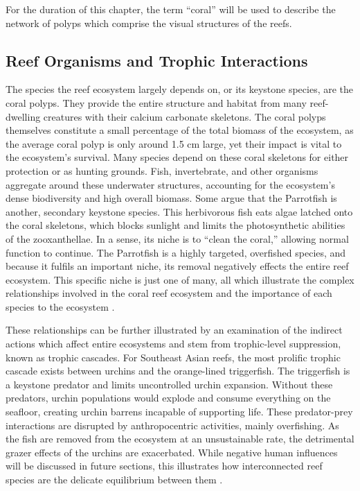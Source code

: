 \documentclass{book}\usepackage{knitr}
\begin{document}
\begin{knitrout}
\begin{kframe}
For the duration of this chapter, the term ``coral'' will be used to describe the network of polyps which comprise the visual structures of the reefs. 

\subsection{Reef Organisms and Trophic Interactions}

The species the reef ecosystem largely depends on, or its keystone species, are the coral polyps. They provide the entire structure and habitat from many reef-dwelling creatures with their calcium carbonate skeletons. The coral polyps themselves constitute a small percentage of the total biomass of the ecosystem, as the average coral polyp is only around 1.5 cm large, yet their impact is vital to the ecosystem's survival. Many species depend on these coral skeletons for either protection or as hunting grounds. Fish, invertebrate, and other organisms aggregate around these underwater structures, accounting for the ecosystem’s dense biodiversity and high overall biomass. Some argue that the Parrotfish is another, secondary keystone species. This herbivorous fish eats algae latched onto the coral skeletons, which blocks sunlight and limits the photosynthetic abilities of the zooxanthellae. In a sense, its niche is to ``clean the coral,'' allowing normal function to continue. The Parrotfish is a highly targeted, overfished species, and because it fulfils an important niche, its removal negatively effects the entire reef ecosystem. This specific niche is just one of many, all which illustrate the complex relationships involved in the coral reef ecosystem and the importance of each species to the ecosystem \citep{https://doi.org/10.1890/15-1492.1}. 

These relationships can be further illustrated by an examination of the indirect actions which affect entire ecosystems and stem from trophic-level suppression, known as trophic cascades. For Southeast Asian reefs, the most prolific trophic cascade exists between urchins and the orange-lined triggerfish. The triggerfish is a keystone predator and limits uncontrolled urchin expansion. Without these predators, urchin populations would explode and consume everything on the seafloor, creating urchin barrens incapable of supporting life. These predator-prey interactions are disrupted by anthropocentric activities, mainly overfishing. As the fish are removed from the ecosystem at an unsustainable rate, the detrimental grazer effects of the urchins are exacerbated. While negative human influences will be discussed in future sections, this illustrates how interconnected reef species are the delicate equilibrium between them \citep{https://doi.org/10.1890/15-1492.1}.


\end{kframe}
\end{knitrout}
\end{document}
